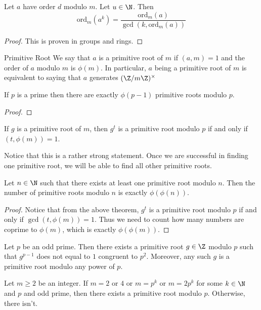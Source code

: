\begin{thm}{}{} Let $a$ have order $d$ modulo $m$. Let $u\in\N$. Then $$\text{ord}_m(a^k)=\frac{\text{ord}_m(a)}{\gcd(k,\text{ord}_m(a))}$$\tcbline
\begin{proof}
This is proven in groups and rings. 
\end{proof}
\end{thm}

\begin{defn}{Primitive Root}{} We say that $a$ is a primitive root of $m$ if $(a,m)=1$ and the order of $a$ modulo $m$ is $\phi(m)$. In particular, $a$ being a primitive root of $m$ is equivalent to saying that $a$ generates $(\Z/m\Z)^{\times}$
\end{defn}

\begin{crl}{}{} If $p$ is a prime then there are exactly $\phi(p-1)$ primitive roots modulo $p$. \tcbline
\begin{proof}
\end{proof}
\end{crl}

\begin{thm}{}{} If $g$ is a primitive root of $m$, then $g^t$ is a primitive root modulo $p$ if and only if $(t,\phi(m))=1$. 
\end{thm}

Notice that this is a rather strong statement. Once we are successful in finding one primitive root, we will be able to find all other primitive roots. 

\begin{prp}{}{} Let $n\in\N$ such that there exists at least one primitive root modulo $n$. Then the number of primitive roots modulo $n$ is exactly $\phi(\phi(n))$. \tcbline
\begin{proof}
Notice that from the above theorem, $g^t$ is a primitive root modulo $p$ if and only if $\gcd(t,\phi(m))=1$. Thus we need to count how many numbers are coprime to $\phi(m)$, which is exactly $\phi(\phi(m))$. 
\end{proof}
\end{prp}

\begin{thm}{}{} Let $p$ be an odd prime. Then there exists a primitive root $g\in\Z$ modulo $p$ such that $g^{p-1}$ does not equal to $1$ congruent to $p^2$. Moreover, any such $g$ is a primitive root modulo any power of $p$. 
\end{thm}

\begin{thm}{}{} Let $m\geq 2$ be an integer. If $m=2$ or $4$ or $m=p^k$ or $m=2p^k$ for some $k\in\N$ and $p$ and odd prime, then there exists a primitive root modulo $p$. Otherwise, there isn't. 
\end{thm}

